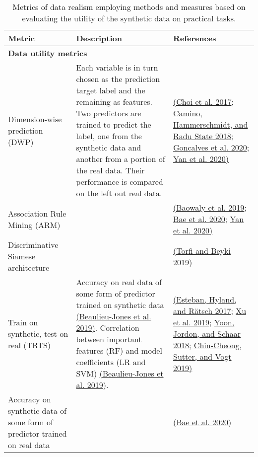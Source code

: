\documentclass[10pt]{article}
\begin{document}
\begin{table}
        
        
        \caption{{Metrics of data realism employing methods and measures based on evaluating the utility of the synthetic data on practical tasks.}}\label{tab:aug-metrics}
        
        \begin{tabular}{@{} p{} p{} p{} @{}} \toprule
        Metric & Description & References\\ \midrule
        
        \multicolumn{3}{Y}{\textbf{Data utility metrics}}\\ \midrule
        
        Dimension-wise prediction (DWP) & Each variable is in turn chosen as the prediction target label and the remaining as features. Two predictors are trained to predict the label, one from the synthetic data and another from a portion of the real data. Their performance is compared on the left out real data.  & \hyperref[csl:47]{(Choi et al. 2017}; \hyperref[csl:22]{Camino, Hammerschmidt, and {Radu State} 2018}; \hyperref[csl:18]{Goncalves et al. 2020}; \hyperref[csl:46]{Yan et al. 2020)}\\[20pt]
        
        Association Rule Mining (ARM) & & \hyperref[csl:29]{(Baowaly et al. 2019}; \hyperref[csl:33]{Bae et al. 2020}; \hyperref[csl:46]{Yan et al. 2020)}\\[20pt]
        
        Discriminative Siamese architecture & & \hyperref[csl:37]{(Torfi and Beyki 2019)}\\[20pt]
        
        Train on synthetic, test on real (TRTS) & Accuracy on real data of some form of predictor trained on synthetic data \hyperref[csl:16]{(Beaulieu-Jones et al. 2019)}. Correlation between important features (RF) and model coefficients (LR and SVM) \hyperref[csl:16]{(Beaulieu-Jones et al. 2019)}. & \hyperref[csl:5]{(Esteban, Hyland, and R{\"a}tsch 2017}; \hyperref[csl:13]{Xu et al. 2019}; \hyperref[csl:20]{Yoon, Jordon, and Schaar 2018}; \hyperref[csl:38]{Chin-Cheong, Sutter, and Vogt 2019)}\\
        
        Accuracy on synthetic data of some form of predictor trained on real data & & \hyperref[csl:33]{(Bae et al. 2020)}\\
        

\end{tabular}
\end{table}
\end{document}

